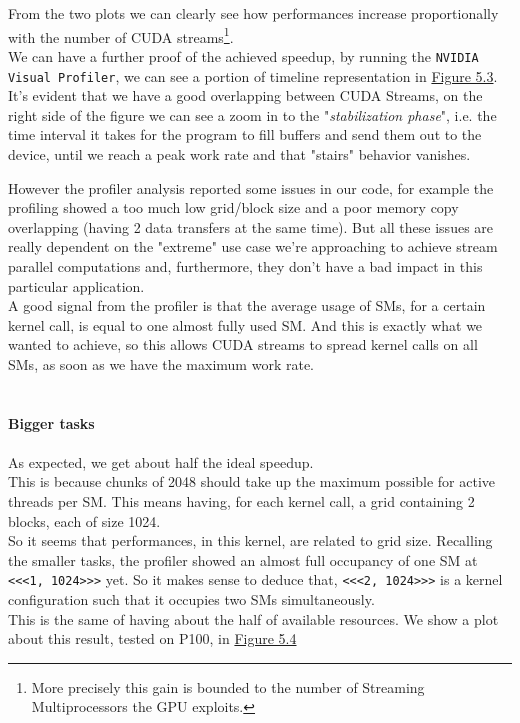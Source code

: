 	From the two plots we can clearly see how performances increase proportionally with the number of CUDA streams\footnote{More precisely this gain is bounded to the number of Streaming Multiprocessors the GPU exploits.}.\\
	We can have a further proof of the achieved speedup, by running the \texttt{NVIDIA Visual Profiler}, we can see a portion of timeline representation in \hyperref[fig:cosprofiling]{Figure 5.3}. It's evident that we have a good overlapping between CUDA Streams, on the right side of the figure we can see a zoom in to the "\textit{stabilization phase}", i.e. the time interval it takes for the program to fill buffers and send them out to the device, until we reach a peak work rate and that "stairs" behavior vanishes.
	
	However the profiler analysis reported some issues in our code, for example the profiling showed a too much low grid/block size and a poor memory copy overlapping (having 2 data transfers at the same time). But all these issues are really dependent on the "extreme" use case we're approaching to achieve stream parallel computations and, furthermore, they don't have a bad impact in this particular application.\\
	A good signal from the profiler is that the average usage of SMs, for a certain kernel call, is equal to one almost fully used SM. And this is exactly what we wanted to achieve, so this allows CUDA streams to spread kernel calls on all SMs, as soon as we have the maximum work rate.\\\\\\
	{\large \textbf{Bigger tasks}}\\\\
	As expected, we get about half the ideal speedup.\\
	This is because chunks of 2048 should take up the maximum possible for active threads per SM. This means having, for each kernel call, a grid containing 2 blocks, each of size 1024.\\
	So it seems that performances, in this kernel, are related to grid size. Recalling the smaller tasks, the profiler showed an almost full occupancy of one SM at \texttt{<<<1, 1024>>>} yet. So it makes sense to deduce that, \texttt{<<<2, 1024>>>} is a kernel configuration such that it occupies two SMs simultaneously. \\
	This is the same of having about the half of available resources.
	We show a plot about this result, tested on P100, in \hyperref[fig:biggerbufferspeedup]{Figure 5.4}
	
